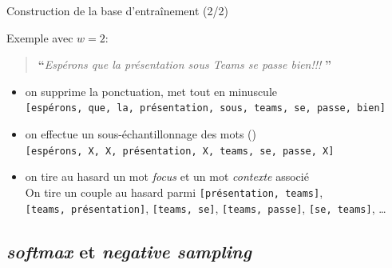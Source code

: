 \documentclass[10pt,xcolor=table,color={dvipsnames,usenames},ignorenonframetext,usepdftitle=false,french]{beamer}
\begin{document}
\begin{frame}[fragile]{Construction de la base d’entraînement (2/2)}
\protect\hypertarget{construction-de-la-base-dentrauxeenement-22}{}

Exemple avec \(w=2\):

\begin{quote}
\LARGE \textbf{``}\normalsize \emph{Espérons que la présentation sous Teams se passe bien!!!} \LARGE \textbf{''}\normalsize
\end{quote}

\begin{itemize}
\item
  on supprime la ponctuation, met tout en minuscule\\
  \faArrowCircleRight{}
  \texttt{{[}espérons,\ que,\ la,\ présentation,\ sous,\ teams,\ se,\ passe,\ bien{]}}
  \pause
\item
  on effectue un sous-échantillonnage des mots
  ()\\
  \faArrowCircleRight{}
  \texttt{{[}espérons,\ X,\ X,\ présentation,\ X,\ teams,\ se,\ passe,\ X{]}}
  \pause
\item
  on tire au hasard un mot \emph{focus} et un mot \emph{contexte}
  associé\\
  \faArrowCircleRight{} On tire un couple au hasard parmi
  \texttt{{[}présentation,\ teams{]}},
  \texttt{{[}teams,\ présentation{]}}, \texttt{{[}teams,\ se{]}},
  \texttt{{[}teams,\ passe{]}}, \texttt{{[}se,\ teams{]}}, \dots
\end{itemize}

\end{frame}

\hypertarget{softmax-et-negative-sampling}{%
\subsection{\texorpdfstring{\emph{softmax} et \emph{negative
sampling}}{softmax et negative sampling}}\label{softmax-et-negative-sampling}}
\end{document}
